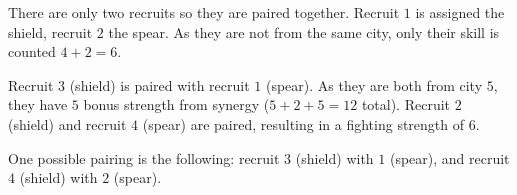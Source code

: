 \nextsample
There are only two recruits so they are paired together.
Recruit $1$ is assigned the shield, recruit $2$ the spear.
As they are not from the same city, only their skill is counted $4 + 2 = 6$.

\nextsample
Recruit $3$ (shield) is paired with recruit $1$ (spear).
As they are both from city $5$, they have $5$ bonus strength from synergy ($5 + 2 + 5 = 12$ total).
Recruit $2$ (shield) and recruit $4$ (spear) are paired, resulting in a fighting strength of $6$.

\nextsample
One possible pairing is the following:
recruit $3$ (shield) with $1$ (spear), and recruit $4$ (shield) with $2$ (spear).